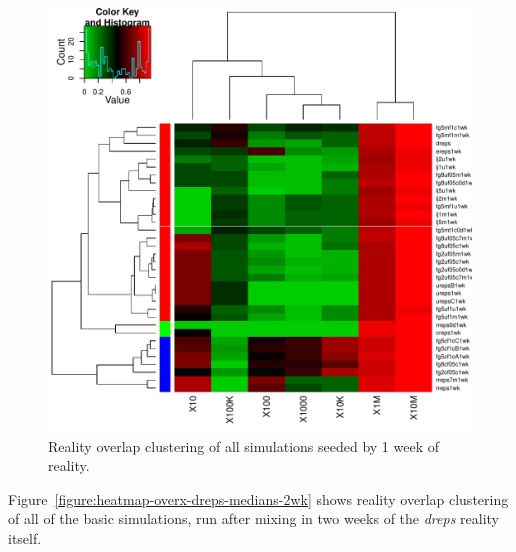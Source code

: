 \documentclass[10pt,oneside]{memoir}
\begin{document}
\begin{figure}
\begin{center}
    \includegraphics{figures/heatmap-overx-dreps-medians-1wk}
    \caption{Reality overlap clustering of all simulations seeded by 1 week of reality.}
    \label{figure:heatmap-overx-dreps-medians-1wk}
\end{center}
\end{figure}
Figure~\ref{figure:heatmap-overx-dreps-medians-2wk} shows reality overlap clustering of all of the basic simulations, run after mixing in two weeks of the {\itshape dreps} reality itself.
\end{document}
